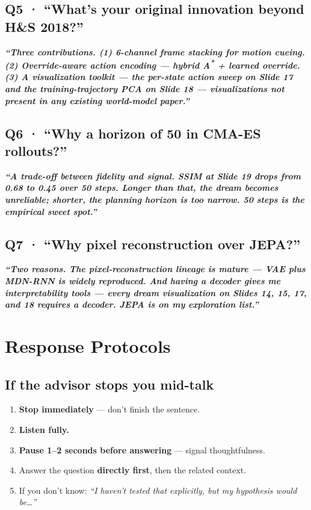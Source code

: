 \documentclass[11pt,a4paper]{article}
\newcommand{\say}[1]{%
    \par\vspace{0.3em}%
    \begingroup
    \leftskip=12pt
    \rightskip=8pt
    \color{thStrong}%
    \itshape\textbf{“#1”}%
    \par
    \endgroup
    \vspace{0.2em}
}
\begin{document}
\subsection*{Q5 · ``What's your original innovation beyond H\&S 2018?''}
\say{Three contributions. (1) \textbf{6-channel frame stacking} for motion cueing. (2) \textbf{Override-aware action encoding} — hybrid A\textsuperscript{*} + learned override. (3) A \textbf{visualization toolkit} — the per-state action sweep on Slide 17 and the training-trajectory PCA on Slide 18 — visualizations not present in any existing world-model paper.}

\subsection*{Q6 · ``Why a horizon of 50 in CMA-ES rollouts?''}
\say{A trade-off between fidelity and signal. SSIM at Slide 19 drops from 0.68 to 0.45 over 50 steps. Longer than that, the dream becomes unreliable; shorter, the planning horizon is too narrow. 50 steps is the empirical sweet spot.}

\subsection*{Q7 · ``Why pixel reconstruction over JEPA?''}
\say{Two reasons. The pixel-reconstruction lineage is mature — VAE plus MDN-RNN is widely reproduced. And having a decoder gives me \textbf{interpretability tools} — every dream visualization on Slides 14, 15, 17, and 18 requires a decoder. JEPA is on my exploration list.}

\section{Response Protocols}

\subsection*{If the advisor stops you mid-talk}
\begin{enumerate}[leftmargin=1.4em, itemsep=0.2em]
\item \textbf{Stop immediately} — don't finish the sentence.
\item \textbf{Listen fully.}
\item \textbf{Pause 1–2 seconds before answering} — signal thoughtfulness.
\item Answer the question \textbf{directly first}, then the related context.
\item If you don't know: \textit{``I haven't tested that explicitly, but my hypothesis would be…''}
\end{enumerate}
\end{document}
